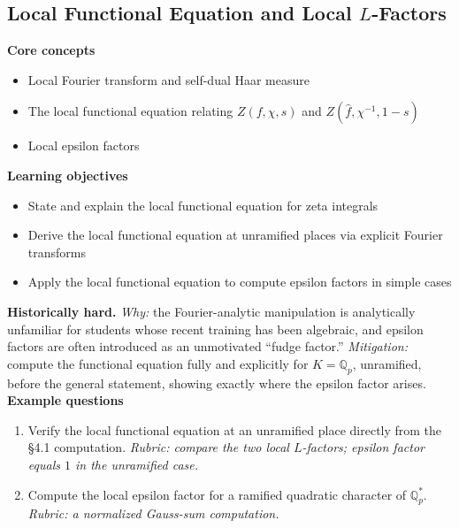 \documentclass[11pt]{article}
\newcommand{\Q}{\mathbb{Q}}
\begin{document}
\subsection{Local Functional Equation and Local $L$-Factors}
\textbf{Core concepts}
\begin{itemize}[noitemsep]
  \item Local Fourier transform and self-dual Haar measure
  \item The local functional equation relating $Z(f,\chi,s)$ and $Z(\hat f,\chi^{-1},1-s)$
  \item Local epsilon factors
\end{itemize}
\textbf{Learning objectives}
\begin{itemize}[noitemsep]
  \item State and explain the local functional equation for zeta integrals
  \item Derive the local functional equation at unramified places via explicit Fourier transforms
  \item Apply the local functional equation to compute epsilon factors in simple cases
\end{itemize}
\textbf{Historically hard.} \emph{Why:} the Fourier-analytic manipulation is analytically unfamiliar for students whose recent training has been algebraic, and epsilon factors are often introduced as an unmotivated ``fudge factor.'' \emph{Mitigation:} compute the functional equation fully and explicitly for $K=\Q_p$, unramified, before the general statement, showing exactly where the epsilon factor arises.
\textbf{Example questions}
\begin{enumerate}[noitemsep]
  \item[Q1 (foundational).] Verify the local functional equation at an unramified place directly from the \S4.1 computation. \emph{Rubric: compare the two local $L$-factors; epsilon factor equals $1$ in the unramified case.}
  \item[Q2 (advanced).] Compute the local epsilon factor for a ramified quadratic character of $\Q_p^*$. \emph{Rubric: a normalized Gauss-sum computation.}
\end{enumerate}

\end{document}

